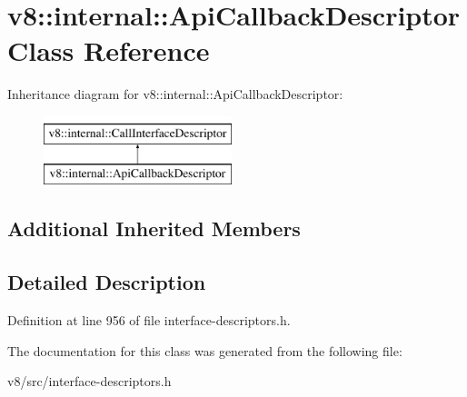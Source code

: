 \hypertarget{classv8_1_1internal_1_1ApiCallbackDescriptor}{}\section{v8\+:\+:internal\+:\+:Api\+Callback\+Descriptor Class Reference}
\label{classv8_1_1internal_1_1ApiCallbackDescriptor}
Inheritance diagram for v8\+:\+:internal\+:\+:Api\+Callback\+Descriptor\+:\begin{figure}[H]
\begin{center}
\leavevmode
\includegraphics[height=2.000000cm]{classv8_1_1internal_1_1ApiCallbackDescriptor}
\end{center}
\end{figure}
\subsection*{Additional Inherited Members}


\subsection{Detailed Description}


Definition at line 956 of file interface-\/descriptors.\+h.



The documentation for this class was generated from the following file\+:\begin{DoxyCompactItemize}
\item 
v8/src/interface-\/descriptors.\+h\end{DoxyCompactItemize}
